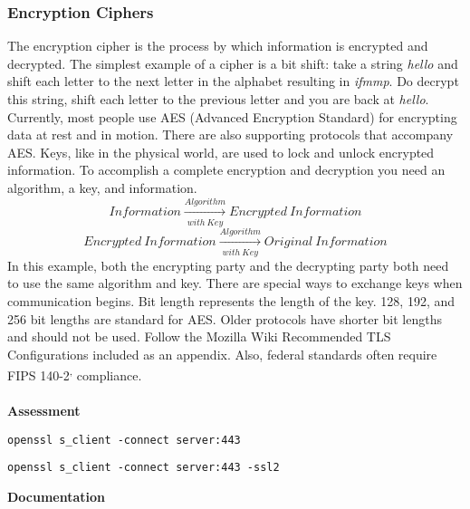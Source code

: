 \subsubsection{Encryption Ciphers}
The encryption cipher is the process by which information is encrypted and decrypted. The simplest example of a cipher is a bit shift: take a string \emph{hello} and shift each letter to the next letter in the alphabet resulting in \emph{ifmmp}. Do decrypt this string, shift each letter to the previous letter and you are back at \emph{hello}.
Currently, most people use AES (Advanced Encryption Standard) for encrypting data at rest and in motion. There are also supporting protocols that accompany AES. Keys, like in the physical world, are used to lock and unlock encrypted information. To accomplish a complete encryption and decryption you need an algorithm, a key, and information.
\begin{equation}
Information \xrightarrow[with\ Key]{Algorithm} Encrypted\ Information
\end{equation}\begin{equation}
Encrypted\ Information \xrightarrow[with\ Key]{Algorithm} Original\ Information
\end{equation}
In this example, both the encrypting party and the decrypting party both need to use the same algorithm and key. There are special ways to exchange keys when communication begins.
Bit length represents the length of the key. 128, 192, and 256 bit lengths are standard for AES. Older protocols have shorter bit lengths and should not be used. Follow the Mozilla Wiki Recommended TLS Configurations included as an appendix. Also, federal standards often require FIPS 140-2\textsuperscript{,} compliance.\\\\
\textbf{Assessment}
\begin{description}
 \begin{verbatim}openssl s_client -connect server:443\end{verbatim}
 \begin{verbatim}openssl s_client -connect server:443 -ssl2\end{verbatim}
\end{description}
\textbf{Documentation}
\begin{description}
\end{description}
